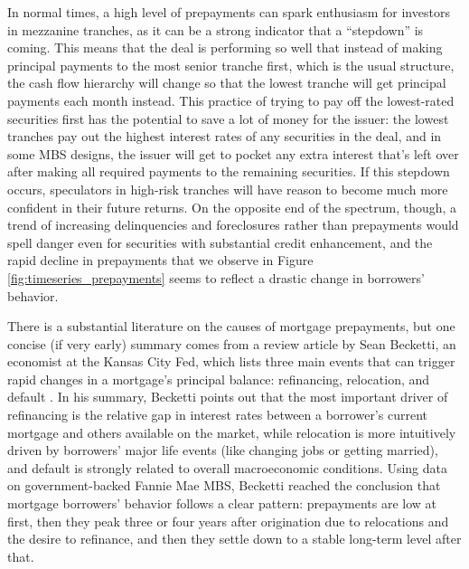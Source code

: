 \documentclass[12pt]{article}
\begin{document}
In normal times, a high level of prepayments can spark enthusiasm for investors in mezzanine tranches, as it can be a strong indicator that a “stepdown” is coming. This means that the deal is performing so well that instead of making principal payments to the most senior tranche first, which is the usual structure, the cash flow hierarchy will change so that the lowest tranche will get principal payments each month instead. This practice of trying to pay off the lowest-rated securities first has the potential to save a lot of money for the issuer: the lowest tranches pay out the highest interest rates of any securities in the deal, and in some MBS designs, the issuer will get to pocket any extra interest that’s left over after making all required payments to the remaining securities. If this stepdown occurs, speculators in high-risk tranches will have reason to become much more confident in their future returns. On the opposite end of the spectrum, though, a trend of increasing delinquencies and foreclosures rather than prepayments would spell danger even for securities with substantial credit enhancement, and the rapid decline in prepayments that we observe in Figure \ref{fig:timeseries_prepayments} seems to reflect a drastic change in borrowers’ behavior.

	There is a substantial literature on the causes of mortgage prepayments, but one concise (if very early) summary comes from a review article by Sean Becketti, an economist at the Kansas City Fed, which lists three main events that can trigger rapid changes in a mortgage’s principal balance: refinancing, relocation, and default \parencite{becketti89}. In his summary, Becketti points out that the most important driver of refinancing is the relative gap in interest rates between a borrower’s current mortgage and others available on the market, while relocation is more intuitively driven by borrowers’ major life events (like changing jobs or getting married), and default is strongly related to overall macroeconomic conditions. Using data on government-backed Fannie Mae MBS, Becketti reached the conclusion that mortgage borrowers’ behavior follows a clear pattern: prepayments are low at first, then they peak three or four years after origination due to relocations and the desire to refinance, and then they settle down to a stable long-term level after that.
	
\end{document}
